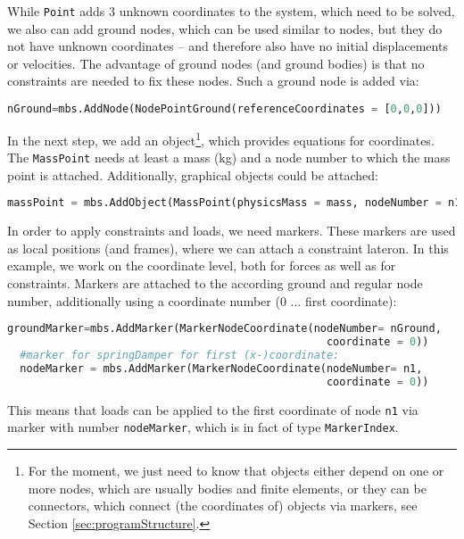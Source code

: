 %
While \texttt{Point} adds 3 unknown coordinates to the system, which need to be solved, we also can add ground nodes, which can be used similar to nodes, but they do not have unknown coordinates -- and therefore also have no initial displacements or velocities. The advantage of ground nodes (and ground bodies) is that no constraints are needed to fix these nodes.
%
Such a ground node is added via:
\begin{lstlisting}[language=Python, firstnumber=22]
  nGround=mbs.AddNode(NodePointGround(referenceCoordinates = [0,0,0]))
\end{lstlisting}
%
In the next step, we add an object\footnote{For the moment, we just need to know that objects either depend on one or more nodes, which are usually bodies and finite elements, or they can be connectors, which connect (the coordinates of) objects via markers, see Section \ref{sec:programStructure}.}, which provides equations for coordinates. The \texttt{MassPoint} needs at least a mass (kg) and a node number to which the mass point is attached. Additionally, graphical objects could be attached:
\begin{lstlisting}[language=Python, firstnumber=23]
  massPoint = mbs.AddObject(MassPoint(physicsMass = mass, nodeNumber = n1))
\end{lstlisting}
%
In order to apply constraints and loads, we need markers. These markers are used as local positions (and frames), where we can attach a constraint lateron. In this example, we work on the coordinate level, both for forces as well as for constraints.
Markers are attached to the according ground and regular node number, additionally using a coordinate number (0 ... first coordinate):
\begin{lstlisting}[language=Python, firstnumber=24]
  groundMarker=mbs.AddMarker(MarkerNodeCoordinate(nodeNumber= nGround, 
                                                  coordinate = 0))
  #marker for springDamper for first (x-)coordinate:
  nodeMarker = mbs.AddMarker(MarkerNodeCoordinate(nodeNumber= n1, 
                                                  coordinate = 0))
\end{lstlisting}
This means that loads can be applied to the first coordinate of node \texttt{n1} via marker with number \texttt{nodeMarker},
which is in fact of type \texttt{MarkerIndex}.

